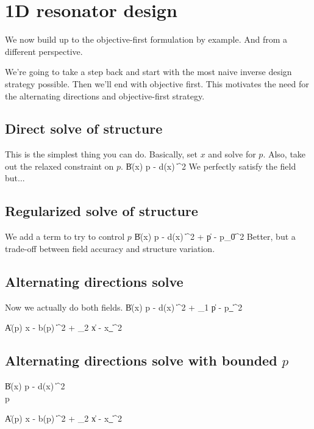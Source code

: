 \section{1D resonator design}
We now build up to the objective-first formulation by example. 
And from a different perspective.

We're going to take a step back and start with the most naive inverse design strategy possible.
Then we'll end with objective first.
This motivates the need for the alternating directions and objective-first strategy.


\subsection{Direct solve of structure}
This is the simplest thing you can do. Basically, set $x$ and solve for $p$.
Also, take out the relaxed constraint on $p$.
\BA {} \| B(x) p - d(x) \|^2 \EA
{}
We perfectly satisfy the field but...

\subsection{Regularized solve of structure}
We add a term to try to control $p$
\BA {} \| B(x) p - d(x) \|^2 + \eta \|p - p_0\|^2 \EA
{}
Better, but a trade-off between field accuracy and structure variation.

\subsection{Alternating directions solve}
Now we actually do both fields.
\BA {} \| B(x) p - d(x) \|^2 + \eta_1 \|p - p_\|^2 \EA

\BA {} \| A(p) x - b(p) \|^2 + \eta_2 \|x - x_\|^2 \EA
{}

\subsection{Alternating directions solve with bounded $p$}
\BA {} \| B(x) p - d(x) \|^2 \\
     \le p  \EA

\BA {} \| A(p) x - b(p) \|^2 + \eta_2 \|x - x_\|^2 \EA
{}


